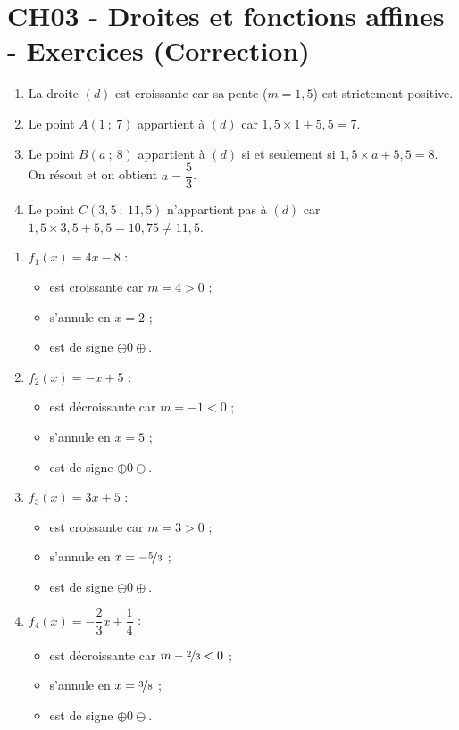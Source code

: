 \documentclass[a4paper,11pt]{article}
\author{Pierquet}
\title{\nomfichier}
\begin{document}
\pagestyle{fancy}

\part{CH03 - Droites et fonctions affines - Exercices (Correction)}

\smallskip


\begin{enumerate}
	\item La droite $(d)$ est croissante car sa pente ($m=1,5$) est strictement positive.
	\item Le point $A(1~;~7)$ appartient à $(d)$ car $1,5 \times 1 + 5,5 = 7$.
	\item Le point $B(a~;~8)$ appartient à $(d)$ si et seulement si $1,5 \times a+5,5=8$. On résout et on obtient $a=\dfrac53$.
	\item Le point $C(3,5~;~11,5)$ n'appartient pas à $(d)$ car $1,5 \times 3,5 + 5,5 = 10,75 \neq 11,5$.
\end{enumerate}

\medskip



\begin{enumerate}
	\item $f_1(x)=4x-8$ :
	\begin{itemize}
		\item est croissante car $m=4 > 0$ ;
		\item s'annule en $x=2$ ;
		\item est de signe $\ominus0\oplus$.
	\end{itemize}
	\item $f_2(x)=-x+5$ :
	\begin{itemize}
		\item est décroissante car $m=-1 < 0$ ;
		\item s'annule en $x=5$ ;
		\item est de signe $\oplus0\ominus$.
	\end{itemize}
	\item $f_3(x)=3x+5$ :
	\begin{itemize}
		\item est croissante car $m=3 > 0$ ;
		\item s'annule en $x=-\nicefrac{5}{3}$ ;
		\item est de signe $\ominus0\oplus$.
	\end{itemize}
	\item $f_4(x)=-\dfrac23x+\dfrac14$ :
	\begin{itemize}
		\item est décroissante car $m-\nicefrac{2}{3} < 0$ ;
		\item s'annule en $x=\nicefrac{3}{8}$ ;
		\item est de signe $\oplus0\ominus$.
	\end{itemize}
\end{enumerate}
\end{document}
